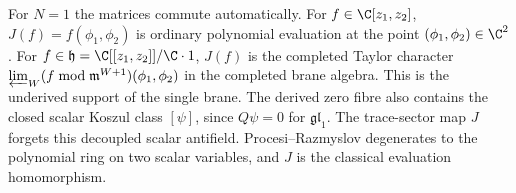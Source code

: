 \documentclass[11pt]{memoir}
\begin{document}
\begin{ex}[Single-point evaluation, \(N=1\)]\label{exa:point-evaluation-N1}
  For \(N=1\) the matrices commute automatically.  For
  \(f\in\C[z_1,z_2]\), \(J(f)=f(\phi_1,\phi_2)\) is ordinary
  polynomial evaluation at the point \((\phi_1,\phi_2)\in\C^2\).  For
  \(f\in\mathfrak h=\C[[z_1,z_2]]/\C\cdot1\), \(J(f)\) is the
  completed Taylor character
  \(\varprojlim_W (f\bmod\mathfrak m^{W+1})(\phi_1,\phi_2)\) in the
  completed brane algebra.  This is the underived support of the
  single brane.  The derived zero fibre also contains the closed
  scalar Koszul class \([\psi]\), since \(Q\psi=0\) for
  \(\mathfrak{gl}_1\).  The trace-sector map \(J\) forgets this
  decoupled scalar antifield.  Procesi--Razmyslov degenerates to the
  polynomial ring on two scalar variables, and \(J\) is the classical
  evaluation homomorphism.
\end{ex}
\end{document}
